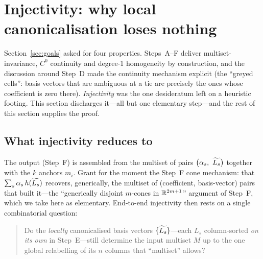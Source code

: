 %

\section{Injectivity: why local canonicalisation loses nothing}
\label{sec:bridge}

Section~\ref{sec:goals} asked for four properties.  Steps~A--F deliver
multiset-invariance, $C^0$ continuity and degree-1 homogeneity by construction,
and the discussion around Step~D made the continuity mechanism explicit (the
``greyed cells'': basis vectors that are ambiguous at a tie are precisely the
ones whose coefficient is zero there).  \emph{Injectivity} was the one
desideratum left on a heuristic footing.  This section discharges it---all but
one elementary step---and the rest of this section supplies the proof.

\subsection*{What injectivity reduces to}

The output (Step~F) is assembled from the multiset of pairs
$\bigl(\alpha_s,\ \widetilde{L_s}\bigr)$ together with the $k$ anchors $m_i$.  Grant
for the moment the Step~F cone mechanism: that $\sum_s\alpha_s\,h(\widetilde{L_s})$
recovers, generically, the multiset of (coefficient, basis-vector) pairs that
built it---the ``generically disjoint $m$-cones in $\mathbb{R}^{2m+1}$'' argument of
Step~F, which we take here as elementary.  End-to-end injectivity then rests on
a single combinatorial question:

\begin{quote}
Do the \emph{locally} canonicalised basis vectors $\{\widetilde{L_s}\}$---each
$L_s$ column-sorted \emph{on its own} in Step~E---still determine the input
multiset $M$ up to the one global relabelling of its $n$ columns that
``multiset'' allows?
\end{quote}

